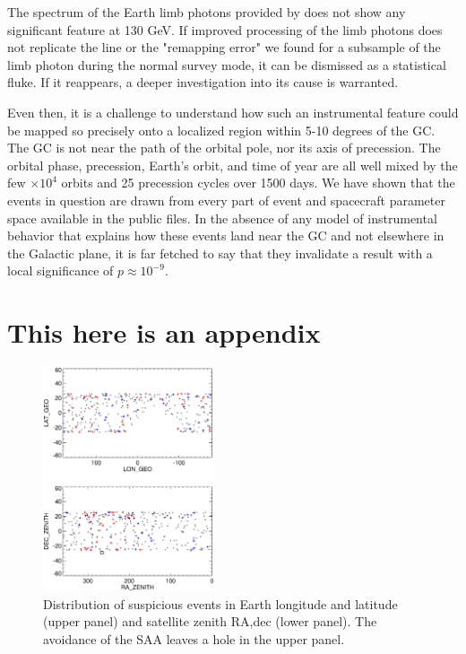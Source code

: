 \documentclass[aps,twocolumn,prd,superscriptaddress,showpacs,nofootinbib,fixfloat]{revtex4}
\begin{document}
The spectrum of the Earth limb photons provided by
\citep{FermiLimb} does not show any significant feature at
130 GeV. If improved processing of the limb photons does not replicate the line
or the "remapping error" we found for a subsample of the
limb photon during the normal survey mode, it can be
dismissed as a statistical fluke.  If it reappears, a deeper
investigation into its cause is warranted.

Even then, it is a challenge to understand how such an
instrumental feature could be mapped so precisely onto a
localized region within 5-10 degrees of the GC.  The GC is
not near the path of the orbital pole, nor its axis of
precession.  The orbital phase, precession, Earth's orbit,
and time of year are all well mixed by the few $\times10^4$
orbits and 25 precession cycles over 1500 days.  We have
shown that the events in question are drawn from every part
of event and spacecraft parameter space available in the
public files.  In the absence of any model of instrumental
behavior that explains how these events land near the GC and
not elsewhere in the Galactic plane, it is far fetched to
say that they invalidate a result with a local significance
of $p\approx10^{-9}$.


\appendix
\section{This here is an appendix}


\begin{figure}
  \centering
  \includegraphics[width=0.45\textwidth]{plots/geo-lonlat.ps}
  \caption{Distribution of suspicious events in Earth
  longitude and latitude (upper panel) and satellite zenith
  RA,dec (lower panel).   The avoidance of the SAA leaves a
  hole in the upper panel.}
  \label{fig:geo-lonlat}
\end{figure}
\end{document}
